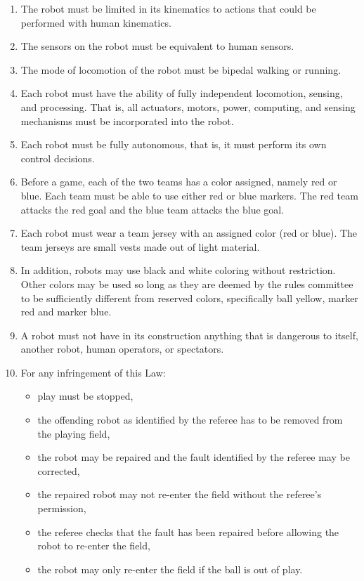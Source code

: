 \documentclass[12pt]{article}
\newcounter{law}[section]
\newenvironment{lawlist}[1][Law]{ %
  \begin{enumerate} %
    \renewcommand{\theenumi}{#1-\arabic{law}.\arabic{enumi}}} %
  {\end{enumerate}}
\begin{document}
\begin{lawlist}
\item \label{kinematics} The robot must be limited in its kinematics
to actions that could be performed with human kinematics.

\item \label{sensing} The sensors on the robot must be equivalent to
human sensors. 

\item \label{walking} The mode of locomotion of the robot must be
bipedal walking or running. 

\item \label{autonomous} Each robot must have the ability of fully
  independent locomotion, sensing, and processing. That is, all
  actuators, motors, power, computing, and sensing mechanisms must be
  incorporated into the robot.

\item \label{autonomous2} Each robot must be fully autonomous, that
  is, it must perform its own control decisions.

\item Before a game, each of the two teams has a color assigned,
  namely red or blue. Each team must be able to use either red
  or blue markers. The red team attacks the red goal and the
  blue team attacks the blue goal. 

\item Each robot must wear a team jersey with an assigned color
(red or blue). The team jerseys are small vests made out of light
material.

\item In addition, robots may use black and white coloring without
  restriction. Other colors may be used so long as they are deemed by
  the rules committee to be sufficiently different from reserved
  colors, specifically ball yellow, marker red and
  marker blue.

\item A robot must not have in its construction anything that is
  dangerous to itself, another robot, human operators, or spectators.

\item For any infringement of this Law:
  \begin{itemize}
  \item play must be stopped,
  \item the offending robot as identified by the referee has to be
    removed from the playing field,
  \item the robot may be repaired and the fault identified by the
    referee may be corrected,
  \item the repaired robot may not re-enter the field without the
    referee's permission,
  \item the referee checks that the fault has been repaired before
    allowing the robot to re-enter the field,
  \item the robot may only re-enter the field if the ball is out of
    play. 
  \end{itemize}
\end{lawlist}
\end{document}
